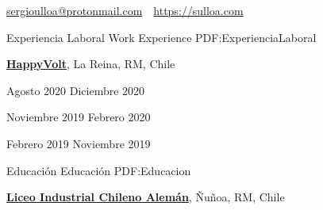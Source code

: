 \documentclass[letterpaper,yyyy,draft]{simpleresumecv}
\newcommand{\CVAuthor}{Sergio A. Ulloa B.}
\newcommand{\CVWebpage}{https://sulloa.com}
\begin{document}
\makeatletter
\let\@oddfoot\@empty{}
\let\@evenfoot\@empty{}
\makeatother

\Title{\CVAuthor}

{
    \begin{SubTitle}
    \href{mailto:sergioulloa@protonmail.com}{sergioulloa@protonmail.com}
    \,\SubBulletSymbol\,
    \href{\CVWebpage}{\url{\CVWebpage}}
    \end{SubTitle}
}

\begin{Body}


\Section
{Experiencia\newline
Laboral}
{Work Experience}
{PDF:ExperienciaLaboral}
{
    \Entry{}
    \href{https://happyvolt.com/}{\textbf{HappyVolt}},
    La Reina, RM, Chile

    \hfill
    Agosto 2020
    Diciembre 2020

    \hfill
    Noviembre 2019
    Febrero 2020

    \hfill
    Febrero 2019
    Noviembre 2019


    \begin{Detail}
    \end{Detail}


    \begin{Detail}
    \end{Detail}
}


\Section
{Educación}
{Educación}
{PDF:Educacion}
{
    \Entry{}
    \href{https://www.lichan.cl/}{\textbf{Liceo Industrial Chileno Alemán}},
    Ñuñoa, RM, Chile
    \hfill
     \-\- 



}
\end{Body}
\end{document}
